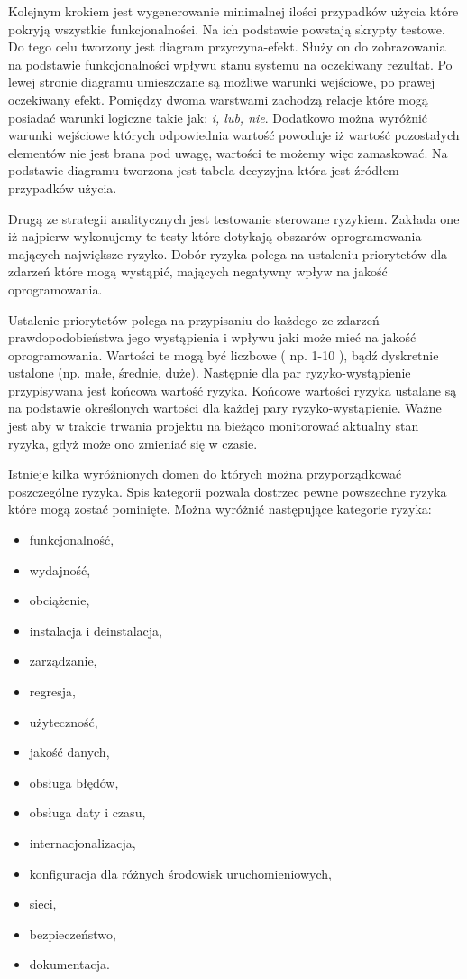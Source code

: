 Kolejnym krokiem jest wygenerowanie minimalnej ilości przypadków użycia które pokryją wszystkie funkcjonalności. Na ich podstawie powstają skrypty testowe. Do tego celu tworzony jest diagram przyczyna-efekt. Służy on do zobrazowania na podstawie funkcjonalności wpływu stanu systemu na oczekiwany rezultat. Po lewej stronie diagramu umieszczane są możliwe warunki wejściowe, po prawej oczekiwany efekt. Pomiędzy dwoma warstwami zachodzą relacje które mogą posiadać warunki logiczne takie jak: \textit{i, lub, nie}. Dodatkowo można wyróżnić warunki wejściowe których odpowiednia wartość powoduje iż wartość pozostałych elementów nie jest brana pod uwagę, wartości te możemy więc zamaskować. Na podstawie diagramu tworzona jest tabela decyzyjna która jest źródłem przypadków użycia.

Drugą ze strategii analitycznych jest testowanie sterowane ryzykiem. Zakłada one iż najpierw wykonujemy te testy które dotykają obszarów oprogramowania mających największe ryzyko.  Dobór ryzyka polega na ustaleniu priorytetów dla zdarzeń które mogą wystąpić, mających negatywny wpływ na jakość oprogramowania.

Ustalenie priorytetów polega na przypisaniu do każdego ze zdarzeń prawdopodobieństwa jego wystąpienia i wpływu jaki może mieć na jakość oprogramowania. Wartości te mogą być liczbowe ( np. 1-10 ), bądź dyskretnie ustalone (np. małe, średnie, duże). Następnie dla par ryzyko-wystąpienie przypisywana jest końcowa wartość ryzyka. Końcowe wartości ryzyka ustalane są na podstawie określonych wartości dla każdej pary ryzyko-wystąpienie. Ważne jest aby w trakcie trwania projektu na bieżąco monitorować aktualny stan ryzyka, gdyż może ono zmieniać się w czasie.

Istnieje kilka wyróżnionych domen do których można przyporządkować poszczególne ryzyka. Spis kategorii pozwala dostrzec pewne powszechne ryzyka które mogą zostać pominięte. Można wyróżnić następujące kategorie ryzyka:

\begin{itemize}
  \item funkcjonalność,
  \item wydajność,
  \item obciążenie,
  \item instalacja i deinstalacja,
  \item zarządzanie,
  \item regresja,
  \item użyteczność,
  \item jakość danych,
  \item obsługa błędów,
  \item obsługa daty i czasu,
  \item internacjonalizacja,
  \item konfiguracja dla różnych środowisk uruchomieniowych,
  \item sieci,
  \item bezpieczeństwo,
  \item dokumentacja.
\end{itemize}

